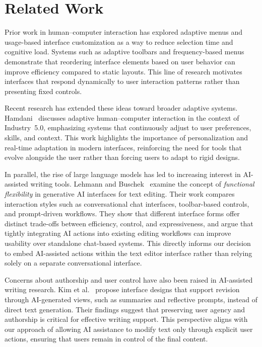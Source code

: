 \documentclass[sigconf]{acmart}
\begin{document}
\section{Related Work}

Prior work in human--computer interaction has explored adaptive menus and usage-based interface customization as a way to reduce selection time and cognitive load. Systems such as adaptive toolbars and frequency-based menus demonstrate that reordering interface elements based on user behavior can improve efficiency compared to static layouts. This line of research motivates interfaces that respond dynamically to user interaction patterns rather than presenting fixed controls.

Recent research has extended these ideas toward broader adaptive systems. Hamdani~\cite{Hamdani2025_AdaptiveHCI} discusses adaptive human--computer interaction in the context of Industry~5.0, emphasizing systems that continuously adjust to user preferences, skills, and context. This work highlights the importance of personalization and real-time adaptation in modern interfaces, reinforcing the need for tools that evolve alongside the user rather than forcing users to adapt to rigid designs.

In parallel, the rise of large language models has led to increasing interest in AI-assisted writing tools. Lehmann and Buschek~\cite{LehmannBuschek2024_FuncFlexAI} examine the concept of \emph{functional flexibility} in generative AI interfaces for text editing. Their work compares interaction styles such as conversational chat interfaces, toolbar-based controls, and prompt-driven workflows. They show that different interface forms offer distinct trade-offs between efficiency, control, and expressiveness, and argue that tightly integrating AI actions into existing editing workflows can improve usability over standalone chat-based systems. This directly informs our decision to embed AI-assisted actions within the text editor interface rather than relying solely on a separate conversational interface.

Concerns about authorship and user control have also been raised in AI-assisted writing research. Kim et al.~\cite{Kim2024_TowardsFullAuthorship} propose interface designs that support revision through AI-generated views, such as summaries and reflective prompts, instead of direct text generation. Their findings suggest that preserving user agency and authorship is critical for effective writing support. This perspective aligns with our approach of allowing AI assistance to modify text only through explicit user actions, ensuring that users remain in control of the final content.
\end{document}
